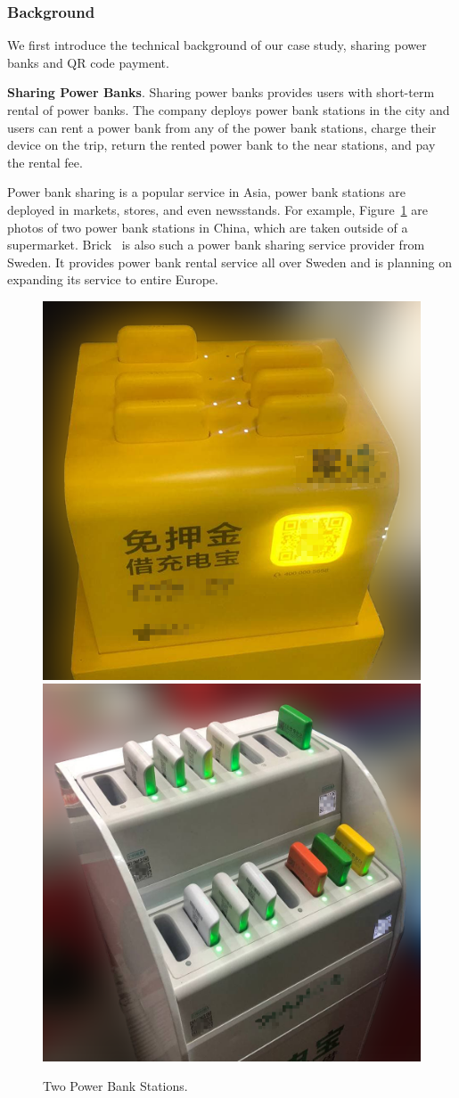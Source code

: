 \subsubsection{Background}

We first introduce the technical background of our case study, sharing power
banks and QR code payment.

\textbf{Sharing Power Banks}. Sharing power banks provides users with short-term
rental of power banks. The company deploys power bank stations in the city and
users can rent a power bank from any of the power bank stations, charge their
device on the trip, return the rented power bank to the near stations, and pay
the rental fee.

Power bank sharing is a popular service in Asia, power bank stations are deployed in markets, stores, and even newsstands.
For example, Figure~\ref{fig:PBS_products} are photos of two power bank stations in China, which are taken outside of a supermarket. Brick~\cite{Brick} is also such a power bank sharing service provider from Sweden.
It provides power bank rental service all over Sweden and is planning on expanding its service to entire Europe.
\begin{figure}[t]
	\centering
	\includegraphics[width=.45 \linewidth, height=.45 \linewidth]{./Figs/PBS_mt.png}
	\includegraphics[width=.45 \linewidth, height=.45 \linewidth]{./Figs/PBS_xd.png}
	\caption{Two Power Bank Stations.}
	\label{fig:PBS_products}
\end{figure}

